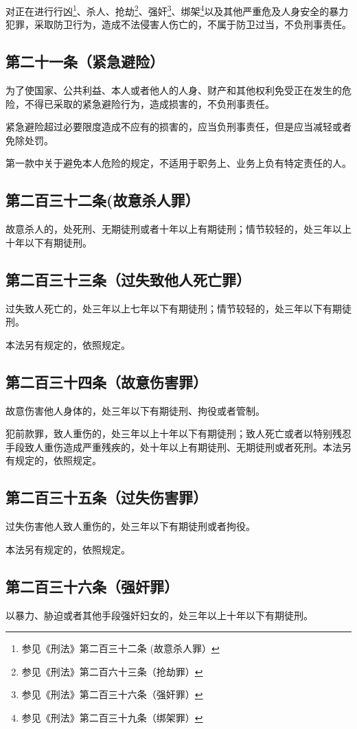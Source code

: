\documentclass[utf-8,10pt]{ctexart}%
\begin{document}
对正在进行行凶\footnote{参见《刑法》第二百三十二条 (故意杀人罪）}、杀人、抢劫\footnote{参见《刑法》第二百六十三条（抢劫罪）}、强奸\footnote{参见《刑法》第二百三十六条（强奸罪）}、绑架\footnote{参见《刑法》第二百三十九条（绑架罪）}以及其他严重危及人身安全的暴力犯罪，采取防卫行为，造成不法侵害人伤亡的，不属于防卫过当，不负刑事责任。
\subsection{第二十一条（紧急避险）}
为了使国家、公共利益、本人或者他人的人身、财产和其他权利免受正在发生的危险，不得已采取的紧急避险行为，造成损害的，不负刑事责任。

紧急避险超过必要限度造成不应有的损害的，应当负刑事责任，但是应当减轻或者免除处罚。

第一款中关于避免本人危险的规定，不适用于职务上、业务上负有特定责任的人。
\subsection{第二百三十二条(故意杀人罪）}
故意杀人的，处死刑、无期徒刑或者十年以上有期徒刑；情节较轻的，处三年以上十年以下有期徒刑。
\subsection{第二百三十三条（过失致他人死亡罪）}
过失致人死亡的，处三年以上七年以下有期徒刑；情节较轻的，处三年以下有期徒刑。

本法另有规定的，依照规定。
\subsection{第二百三十四条（故意伤害罪）}
故意伤害他人身体的，处三年以下有期徒刑、拘役或者管制。

犯前款罪，致人重伤的，处三年以上十年以下有期徒刑；致人死亡或者以特别残忍手段致人重伤造成严重残疾的，处十年以上有期徒刑、无期徒刑或者死刑。本法另有规定的，依照规定。
\subsection{第二百三十五条（过失伤害罪）}
过失伤害他人致人重伤的，处三年以下有期徒刑或者拘役。

本法另有规定的，依照规定。
\subsection{第二百三十六条（强奸罪）}
以暴力、胁迫或者其他手段强奸妇女的，处三年以上十年以下有期徒刑。
\end{document}
